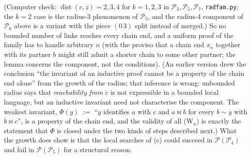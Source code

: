 \documentclass[11pt]{amsart}
\theoremstyle{definition}
\renewcommand{\P}{\mathcal{P}}
\newcommand{\mt}{\bowtie}   %
\begin{document}
(Computer check: $\operatorname{dist}(c,z)=2,3,4$ for $k=1,2,3$ in $\P_3,\P_5,\P_7$, \texttt{radfam.py}; the $k=2$ case is the radius-$3$ phenomenon of $\P_5$, and the radius-$4$ component of $\P_6$ above is a variant with the piece $(0\,3)$ split instead of merged.) So no bounded number of links reaches every chain end, and a uniform proof of the family has to handle arbitrary $n$ (with the proviso that a chain end $x_n$ together with its partner $b$ might still admit a shorter chain to some other partner; the lemma concerns the component, not the conditions). (An earlier version drew the conclusion ``the invariant of an inductive proof cannot be a property of the chain end alone'' from the growth of the radius; that inference is wrong: unbounded radius says that \emph{reachability from $c$} is not expressible in a bounded local language, but an inductive invariant need not characterise the component. The weakest invariant, $\Phi(y)$ $:=$ ``$y$ identifies $a$ with $c$ and $a\mt b$ for every $b\sim y$ with $b\mt c$'', is a property of the chain end, and the validity of all (W$_n$) is exactly the statement that $\Phi$ is closed under the two kinds of steps described next.) What the growth does show is that the local searches of (c) could succeed in $\P(\P_4)$ and fail in $\P(\P_5)$ for a structural reason.
\end{document}
